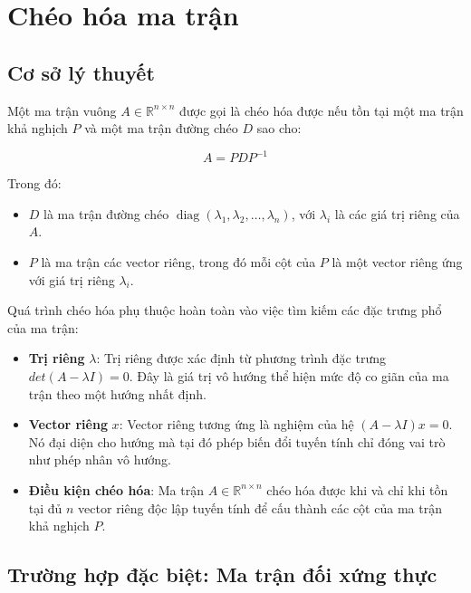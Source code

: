 \newpage

\section{Chéo hóa ma trận}

\subsection{Cơ sở lý thuyết}

Một ma trận vuông $A \in \mathbb{R}^{n \times n}$ được gọi là chéo hóa được nếu tồn tại một ma trận khả nghịch $P$ và một ma trận đường chéo $D$ sao cho:

{\large
\begin{equation}
    A = PDP^{-1}
\end{equation}
}

Trong đó:

\begin{itemize}[topsep=0pt, itemsep=2.5pt, leftmargin=1.5cm]
    \item $D$ là ma trận đường chéo $\operatorname{diag}(\lambda_1, \lambda_2, \dots, \lambda_n)$, với $\lambda_i$ là các giá trị riêng của $A$.
    \item $P$ là ma trận các vector riêng, trong đó mỗi cột của $P$ là một vector riêng ứng với giá trị riêng $\lambda_i$.
\end{itemize}

Quá trình chéo hóa phụ thuộc hoàn toàn vào việc tìm kiếm các đặc trưng phổ của ma trận:

\begin{itemize}[topsep=0pt, itemsep=2.5pt, leftmargin=1.5cm]
    \item \textbf{Trị riêng} $\lambda$: Trị riêng được xác định từ phương trình đặc trưng $det(A - \lambda I) = 0$. Đây là giá trị vô hướng thể hiện mức độ co giãn của ma trận theo một hướng nhất định.
    \item \textbf{Vector riêng} $x$: Vector riêng tương ứng là nghiệm của hệ $(A - \lambda I)x = 0$. Nó đại diện cho hướng mà tại đó phép biến đổi tuyến tính chỉ đóng vai trò như phép nhân vô hướng.
    \item \textbf{Điều kiện chéo hóa}: Ma trận $A \in \mathbb{R}^{n \times n}$ chéo hóa được khi và chỉ khi tồn tại đủ $n$ vector riêng độc lập tuyến tính để cấu thành các cột của ma trận khả nghịch $P$.
\end{itemize}

\subsection{Trường hợp đặc biệt: Ma trận đối xứng thực}


